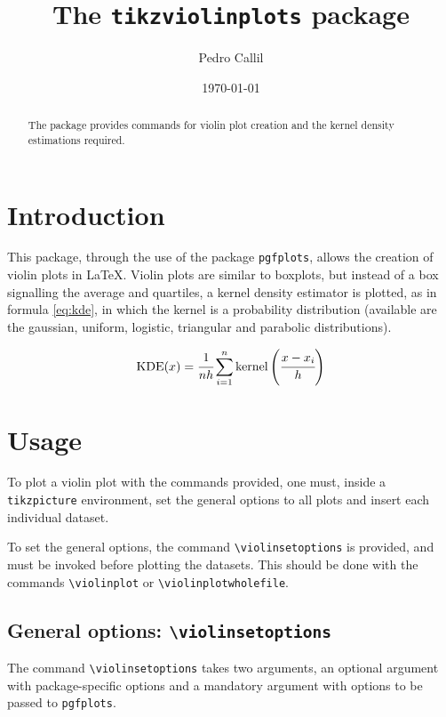 \documentclass{article}
\title{The \texttt{tikzviolinplots} package}
\author{Pedro Callil}
\date{\today}
\begin{document}
\maketitle

\begin{abstract}
	The package provides commands for violin plot creation and
	the kernel density estimations required.
\end{abstract}

\section{Introduction}

This package, through the use of the package \texttt{pgfplots}, allows the
creation of violin plots in \LaTeX. Violin plots are similar to boxplots,
but instead of a box signalling the average and quartiles, a kernel density
estimator is plotted, as in formula \ref{eq:kde}, in which the kernel is a
probability distribution (available are the gaussian, uniform, logistic,
triangular and parabolic distributions).

\begin{equation}
	\label{eq:kde}
	\textnormal{KDE}(x) = %
	\cfrac{1}{nh}\sum_{i=1}^n\textnormal{kernel}\left(\cfrac{x-x_i}{h}\right)
\end{equation}

\section{Usage}

To plot a violin plot with the commands provided, one must, inside
a \texttt{tikzpicture} environment, set the general options to all
plots and insert each individual dataset.

To set the general options, the command \texttt{{\textbackslash}violinsetoptions}
is provided, and must be invoked before plotting the datasets. This should
be done with the commands \texttt{{\textbackslash}violinplot} or
\texttt{{\textbackslash}violinplotwholefile}.

\subsection{General options: \texttt{{\textbackslash}violinsetoptions}}

The command \texttt{{\textbackslash}violinsetoptions} takes two arguments,
an optional argument with package-specific options and a mandatory
argument with options to be passed to \texttt{pgfplots}.
\end{document}
